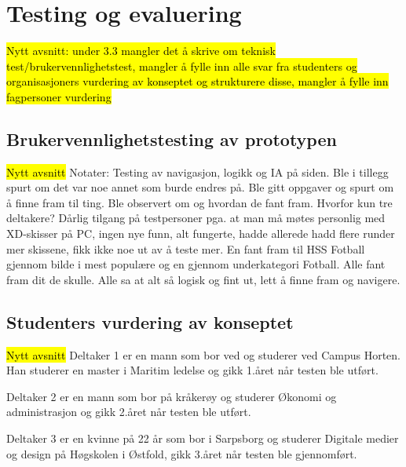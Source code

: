 \section{Testing og evaluering}
\hl{Nytt avsnitt: under 3.3 mangler det å skrive om teknisk test/brukervennlighetstest, mangler å fylle inn alle svar fra studenters og organisasjoners vurdering av konseptet og strukturere disse, mangler å fylle inn fagpersoner vurdering}

\subsection{Brukervennlighetstesting av prototypen}
\hl{Nytt avsnitt}
Notater:
Testing av navigasjon, logikk og IA på siden.
Ble i tillegg spurt om det var noe annet som burde endres på.
Ble gitt oppgaver og spurt om å finne fram til ting.
Ble observert om og hvordan de fant fram.
Hvorfor kun tre deltakere? Dårlig tilgang på testpersoner pga. at man må møtes personlig med XD-skisser på PC, ingen nye funn, alt fungerte, hadde allerede hadd flere runder mer skissene, fikk ikke noe ut av å teste mer.
En fant fram til HSS Fotball gjennom bilde i mest populære og en gjennom underkategori Fotball.
Alle fant fram dit de skulle.
Alle sa at alt så logisk og fint ut, lett å finne fram og navigere.

\subsection{Studenters vurdering av konseptet}
\hl{Nytt avsnitt}
Deltaker 1 er en mann som bor ved og studerer ved Campus Horten. Han studerer en master i Maritim ledelse og gikk 1.året når testen ble utført.

Deltaker 2 er en mann som bor på kråkerøy og studerer Økonomi og administrasjon og gikk 2.året når testen ble utført. %

Deltaker 3 er en kvinne på 22 år som bor i Sarpsborg og studerer Digitale medier og design på Høgskolen i Østfold, gikk 3.året når testen ble gjennomført.

